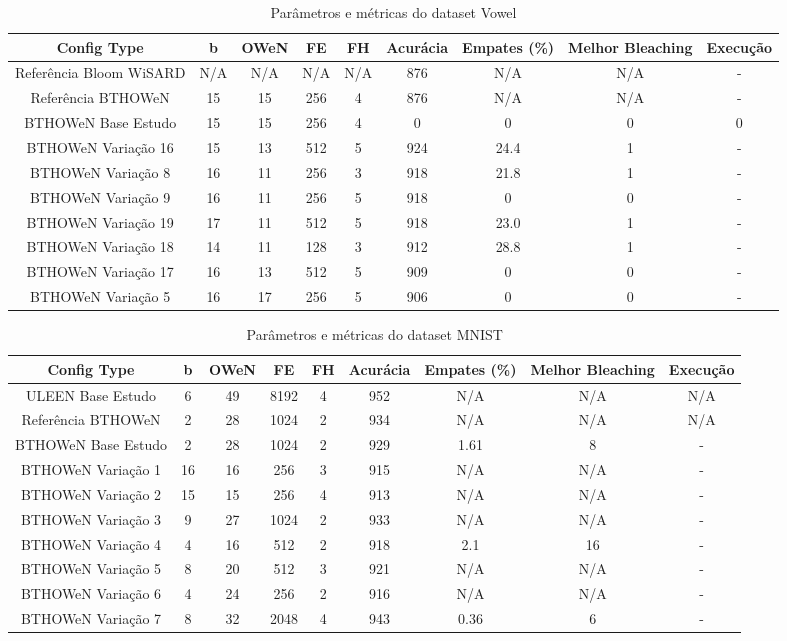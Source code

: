 \documentclass{article}
\begin{document}
{\begin{longtable}{|c|c|c|c|c|c|c|c|c|}
\caption{Parâmetros e métricas do dataset Vowel} \\
\hline
\textbf{Config Type} & \textbf{b} & \textbf{OWeN} & \textbf{FE} & \textbf{FH} & \textbf{Acurácia} & \textbf{Empates (\%)} & \textbf{Melhor Bleaching} & \textbf{Execução} \\
\hline
Referência Bloom WiSARD & N/A & N/A & N/A & N/A & 876 & N/A & N/A & - \\
\hline
Referência BTHOWeN & 15 & 15 & 256 & 4 & 876 & N/A & N/A & - \\
\hline
BTHOWeN Base Estudo & 15 & 15 & 256 & 4 & 0 & 0 & 0 & 0 \\
\hline
BTHOWeN Variação 16 & 15 & 13 & 512 & 5 & 924 & 24.4 & 1 & - \\
\hline
BTHOWeN Variação 8 & 16 & 11 & 256 & 3 & 918 & 21.8 & 1 & - \\
\hline
BTHOWeN Variação 9 & 16 & 11 & 256 & 5 & 918 & 0 & 0 & - \\
\hline
BTHOWeN Variação 19 & 17 & 11 & 512 & 5 & 918 & 23.0 & 1 & - \\
\hline
BTHOWeN Variação 18 & 14 & 11 & 128 & 3 & 912 & 28.8 & 1 & - \\
\hline
BTHOWeN Variação 17 & 16 & 13 & 512 & 5 & 909 & 0 & 0 & - \\
\hline
BTHOWeN Variação 5 & 16 & 17 & 256 & 5 & 906 & 0 & 0 & - \\
\hline
\end{longtable}

\begin{longtable}{|c|c|c|c|c|c|c|c|c|}
\caption{Parâmetros e métricas do dataset MNIST} \\
\hline
\textbf{Config Type} & \textbf{b} & \textbf{OWeN} & \textbf{FE} & \textbf{FH} & \textbf{Acurácia} & \textbf{Empates (\%)} & \textbf{Melhor Bleaching} & \textbf{Execução} \\
\hline
ULEEN Base Estudo & 6 & 49 & 8192 & 4 & 952 & N/A & N/A & N/A \\
\hline
Referência BTHOWeN & 2 & 28 & 1024 & 2 & 934 & N/A & N/A & N/A \\
\hline
BTHOWeN Base Estudo & 2 & 28 & 1024 & 2 & 929 & 1.61 & 8 & - \\
\hline
BTHOWeN Variação 1 & 16 & 16 & 256 & 3 & 915 & N/A & N/A & - \\
\hline
BTHOWeN Variação 2 & 15 & 15 & 256 & 4 & 913 & N/A & N/A & - \\
\hline
BTHOWeN Variação 3 & 9 & 27 & 1024 & 2 & 933 & N/A & N/A & - \\
\hline
BTHOWeN Variação 4 & 4 & 16 & 512 & 2 & 918 & 2.1 & 16 & - \\
\hline
BTHOWeN Variação 5 & 8 & 20 & 512 & 3 & 921 & N/A & N/A & - \\
\hline
BTHOWeN Variação 6 & 4 & 24 & 256 & 2 & 916 & N/A & N/A & - \\
\hline
BTHOWeN Variação 7 & 8 & 32 & 2048 & 4 & 943 & 0.36 & 6 & - \\
\hline
\end{longtable}
}
\end{document}
